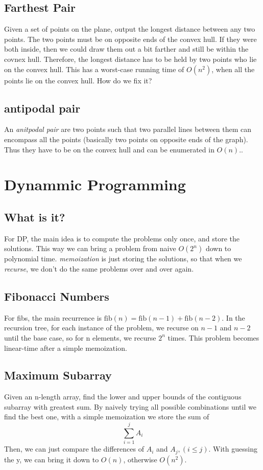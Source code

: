 \documentclass[portrait,10pt, a4paper]{article}
\begin{document}
\begin{multicols*}{3}
	\subsection{Farthest Pair}
		Given a set of points on the plane, output the longest distance between any two points. The two points
		must be on opposite ends of the convex hull. If they were both inside, then we could draw them out a bit
		farther and still be within the covnex hull. Therefore, the longest distance has to be held by two 
		points who lie on the convex hull. This has a worst-case running time of $O(n^{2})$, when all the points
		lie on the convex hull. How do we fix it?
	\subsection{antipodal pair}
		An \textit{anitpodal pair} are two points such that two parallel lines between them can encompass all the points
		(basically two points on opposite ends of the graph). Thus they have to be on the convex hull and can be enumerated
		in $O(n)$..
\section{Dynammic Programming}
	\subsection{What is it?}
		For DP, the main idea is to compute the problems only once, and store the solutions. This way we can bring a problem
		from naive $O(2^{n})$ down to polynomial time. \textit{memoization} is just storing the solutions, so that when we
		\textit{recurse}, we don't do the same problems over and over again.
	\subsection{Fibonacci Numbers}
		For fibs, the main recurrence is $\text{fib}(n) = \text{fib}(n-1) + \text{fib}(n-2)$. In the recursion tree, for each instance
		of the problem, we recurse on $n-1$ and $n-2$ until the base case, so for n elements, we recurse $2^{n}$ times. This problem
		becomes linear-time after a simple memoization.
	\subsection{Maximum Subarray}
		Given an n-length array, find the lower and upper bounds of the contiguous subarray with greatest sum. By naively trying all 
		possible combinations until we find the best one, with a simple memoization we store the sum of 
		$$ \sum_{i=1}^{j}A_{i}$$ Then, we can just compare the differences of  $A_{i}$ and $A_{j},(i\leq j)$. With guessing the y,
		we can bring it down to $O(n)$, otherwise $O(n^{2})$.

\end{multicols*}
\end{document}
